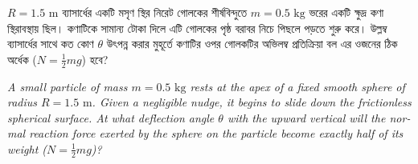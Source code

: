 \documentclass[12pt, a4paper]{article}
\begin{document}
\newpage

\begin{tcolorbox}[questionbox={প্রশ্ন (Question) 13}]
    \noindent
    $R = 1.5\text{ m}$ ব্যাসার্ধের একটি মসৃণ স্থির নিরেট গোলকের শীর্ষবিন্দুতে $m = 0.5\text{ kg}$ ভরের একটি ক্ষুদ্র কণা স্থিরাবস্থায় ছিল। কণাটিকে সামান্য টোকা দিলে এটি গোলকের পৃষ্ঠ বরাবর নিচে পিছলে পড়তে শুরু করে। উল্লম্ব ব্যাসার্ধের সাথে কত কোণ $\theta$ উৎপন্ন করার মুহূর্তে কণাটির ওপর গোলকটির অভিলম্ব প্রতিক্রিয়া বল এর ওজনের ঠিক অর্ধেক ($N = \frac{1}{2} mg$) হবে?
    
    \vspace{0.8em}
    \begin{english}
    \noindent\textit{\color{darkgray}
    A small particle of mass $m = 0.5\text{ kg}$ rests at the apex of a fixed smooth sphere of radius $R = 1.5\text{ m}$. Given a negligible nudge, it begins to slide down the frictionless spherical surface. At what deflection angle $\theta$ with the upward vertical will the normal reaction force exerted by the sphere on the particle become exactly half of its weight ($N = \frac{1}{2} mg$)?
    }
    \end{english}
\end{tcolorbox}
\end{document}
